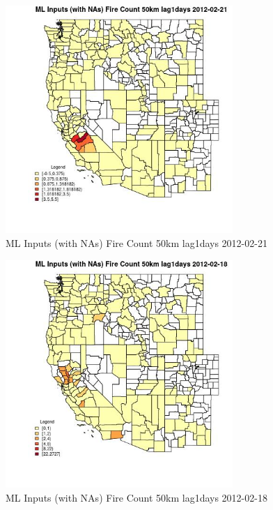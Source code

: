 \begin{figure} 
\centering  
\includegraphics[width=0.77\textwidth]{Code_Outputs/Report_ML_input_PM25_Step4_part_f_de_duplicated_aveswNAs_CountyFire_Count_50km_lag1daysMean2012-02-21.jpg} 
\caption{\label{fig:Report_ML_input_PM25_Step4_part_f_de_duplicated_aveswNAsCountyFire_Count_50km_lag1daysMean2012-02-21}ML Inputs (with NAs) Fire Count 50km lag1days 2012-02-21} 
\end{figure} 
 

\begin{figure} 
\centering  
\includegraphics[width=0.77\textwidth]{Code_Outputs/Report_ML_input_PM25_Step4_part_f_de_duplicated_aveswNAs_CountyFire_Count_50km_lag1daysMean2012-02-18.jpg} 
\caption{\label{fig:Report_ML_input_PM25_Step4_part_f_de_duplicated_aveswNAsCountyFire_Count_50km_lag1daysMean2012-02-18}ML Inputs (with NAs) Fire Count 50km lag1days 2012-02-18} 
\end{figure} 
 

